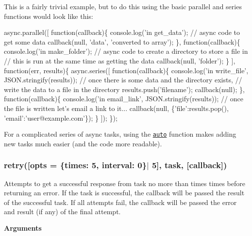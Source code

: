 This is a fairly trivial example, but to do this using the basic parallel and series functions would look like this\+:


\begin{DoxyCode}
async.parallel([
    function(callback)\{
        console.log('in get\_data');
        // async code to get some data
        callback(null, 'data', 'converted to array');
    \},
    function(callback)\{
        console.log('in make\_folder');
        // async code to create a directory to store a file in
        // this is run at the same time as getting the data
        callback(null, 'folder');
    \}
],
function(err, results)\{
    async.series([
        function(callback)\{
            console.log('in write\_file', JSON.stringify(results));
            // once there is some data and the directory exists,
            // write the data to a file in the directory
            results.push('filename');
            callback(null);
        \},
        function(callback)\{
            console.log('in email\_link', JSON.stringify(results));
            // once the file is written let's email a link to it...
            callback(null, \{'file':results.pop(), 'email':'user@example.com'\});
        \}
    ]);
\});
\end{DoxyCode}


For a complicated series of {\ttfamily async} tasks, using the \href{#auto}{\tt {\ttfamily auto}} function makes adding new tasks much easier (and the code more readable).





\label{_retry}%
 \subsubsection*{retry(\mbox{[}opts = \{times\+: 5, interval\+: 0\}$\vert$ 5\mbox{]}, task, \mbox{[}callback\mbox{]})}

Attempts to get a successful response from {\ttfamily task} no more than {\ttfamily times} times before returning an error. If the task is successful, the {\ttfamily callback} will be passed the result of the successful task. If all attempts fail, the callback will be passed the error and result (if any) of the final attempt.

{\bfseries Arguments}


